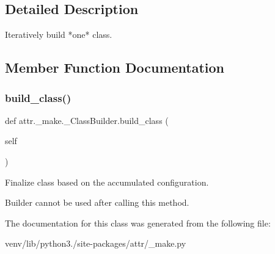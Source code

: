 \subsection{Detailed Description}
\begin{DoxyVerb}Iteratively build *one* class.
\end{DoxyVerb}
 

\subsection{Member Function Documentation}
\mbox{\label{classattr_1_1__make_1_1___class_builder_a21e6abffb1b71a1a93ac693331cccb22}} 
\subsubsection{\texorpdfstring{build\+\_\+class()}{build\_class()}}
{\footnotesize\ttfamily def attr.\+\_\+make.\+\_\+\+Class\+Builder.\+build\+\_\+class (\begin{DoxyParamCaption}\item[{}]{self }\end{DoxyParamCaption})}

\begin{DoxyVerb}Finalize class based on the accumulated configuration.

Builder cannot be used after calling this method.
\end{DoxyVerb}
 

The documentation for this class was generated from the following file\+:\begin{DoxyCompactItemize}
\item 
venv/lib/python3./site-\/packages/attr/\+\_\+make.\+py\end{DoxyCompactItemize}
